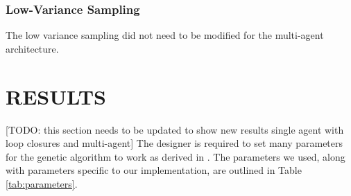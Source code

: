 \documentclass[letterpaper, 10 pt, conference]{ieeeconf}  %
\newcommand{\todo}[1]{{\color{blue}[TODO: #1]}}
\begin{document}
\subsubsection{Low-Variance Sampling}
The low variance sampling did not need to be modified for the multi-agent architecture.

\section{RESULTS}\label{results}
\todo{this section needs to be updated to show new results single agent with loop closures and multi-agent}
The designer is required to set many parameters for the genetic algorithm to work as derived in \cite{Parkinson2019}. The parameters we used, along with parameters specific to our implementation, are outlined in Table \ref{tab:parameters}.
\end{document}
